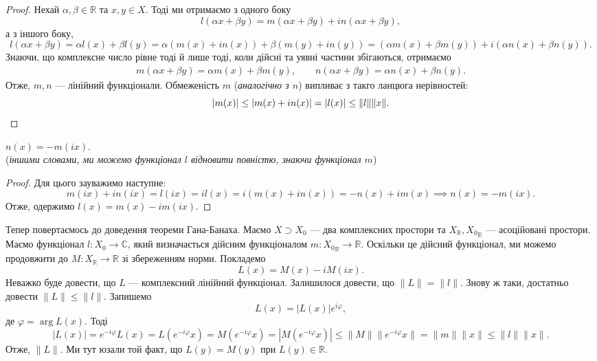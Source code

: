 \documentclass{math_library}
\begin{document}
\begin{proof}
Нехай $\alpha,\beta \in \mathbb{R}$ та $x,y \in X$. Тоді ми отримаємо з одного боку
\[
l(\alpha x + \beta y) = m(\alpha x + \beta y) + i n(\alpha x + \beta y),
\]
а з іншого боку,
\[
l(\alpha x + \beta y) = \alpha l(x) + \beta l(y) = \alpha (m(x) + i n(x)) + \beta (m(y) + i n(y)) = (\alpha m(x) + \beta m(y)) + i(\alpha n(x) + \beta n(y)).
\]
Знаючи, що комплексне число рівне тоді й лише тоді, коли дійсні та уявні частини збігаються, отримаємо
\begin{align*}
m(\alpha x + \beta y) = \alpha m(x) + \beta m(y), \qquad n(\alpha x + \beta y) = \alpha n(x) + \beta n(y).
\end{align*}
Отже, $m,n$ --- лінійний функціонали. Обмеженість $m$ (\textit{аналогічно з $n$}) випливає з такго ланцюга нерівностей:
\[
|m(x)| \leq |m(x) + in(x)| = |l(x)| \leq \|l\| \|x\|. \qedhere
\]
\end{proof}

\begin{proposition}
$n(x) = -m(ix)$.\\
(\textit{іншими словами, ми можемо функціонал $l$ відновити повністю, знаючи функціонал $m$})
\end{proposition}

\begin{proof}
Для цього зауважимо наступне:
\[
m(ix) + in(ix) = l(ix) = i l(x) = i(m(x) + in(x)) = -n(x) + im(x) \implies n(x) = -m(ix).
\]
Отже, одержимо $l(x) = m(x) -im(ix)$.
\end{proof}

Тепер повертаємось до доведення теореми Гана-Банаха. Маємо $X \supset X_0$ --- два комплексних простори та $X_{\mathbb{R}}, {X_0}_{\mathbb{R}}$ --- асоційовані простори. Маємо функціонал $l \colon X_0 \to \mathbb{C}$, який визначається дійсним функціоналом $m \colon {X_0}_{\mathbb{R}} \to \mathbb{R}$. Оскільки це дійсний функціонал, ми можемо продовжити до $M \colon X_{\mathbb{R}} \to \mathbb{R}$ зі збереженням норми. Покладемо 
\[
L(x) = M(x) - i M(ix).
\]
Неважко буде довести, що $L$ --- комплексний лінійний функціонал. Залишилося довести, що $\|L\| = \|l\|$. Знову ж таки, достатньо довести $\|L\| \leq \|l\|$. Запишемо
\[
L(x) = |L(x)|e^{i \varphi},
\]
де $\varphi = \arg L(x)$. Тоді
\[
|L(x)| = e^{-i \varphi} L(x) = L(e^{-i \varphi} x) = M(e^{-i \varphi} x) = |M(e^{-i \varphi}x)| \leq \|M\| \|e^{-i \varphi} x\| = \|m\| \|x\| \leq \|l\| \|x\|.
\]
Отже, $\|L\|$. Ми тут юзали той факт, що $L(y) = M(y)$ при $L(y) \in \mathbb{R}$.
\end{document}
